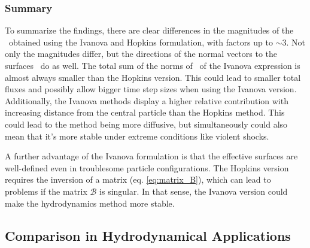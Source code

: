 
\subsubsection{Summary}


To summarize the findings, there are clear differences in the magnitudes of the \Aij\ obtained
using the Ivanova and Hopkins formulation, with factors up to $\sim 3$.
Not only the magnitudes differ, but the directions of the normal vectors to the surfaces \Aij\ do
as well. The total sum of the norms of \Aij\ of the Ivanova expression is almost always smaller
than the Hopkins version. This could lead to smaller total fluxes and possibly allow bigger time
step sizes when using the Ivanova version. Additionally, the Ivanova methods display a higher
relative contribution with increasing distance from the central particle than the Hopkins method.
This could lead to the method being more diffusive, but simultaneously could also mean that it's
more stable under extreme conditions like violent shocks.

A further advantage of the Ivanova formulation is that the effective surfaces are well-defined even
in troublesome particle configurations. The Hopkins version requires the inversion of a matrix (eq.
\ref{eq:matrix_B}), which can lead to problems if the matrix $\mathcal{B}$ is singular.
In that sense, the Ivanova version could make the hydrodynamics method more stable.











\subsection{Comparison in Hydrodynamical Applications}

